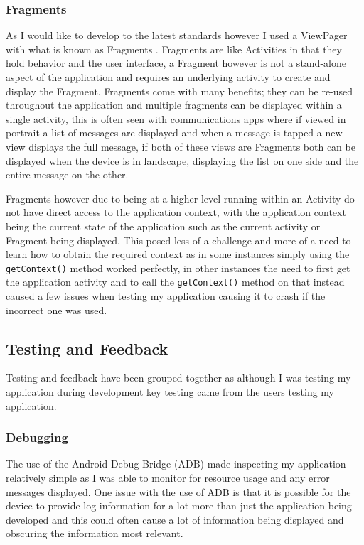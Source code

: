 \subsubsection{Fragments}\label{fragments}

As I would like to develop to the latest standards however I used a
ViewPager with what is known as Fragments \parencite{fragment}.
Fragments are like Activities in that they hold behavior and the user
interface, a Fragment however is not a stand-alone aspect of the
application and requires an underlying activity to create and display
the Fragment. Fragments come with many benefits; they can be re-used
throughout the application and multiple fragments can be displayed
within a single activity, this is often seen with communications apps
where if viewed in portrait a list of messages are displayed and when a
message is tapped a new view displays the full message, if both of these
views are Fragments both can be displayed when the device is in
landscape, displaying the list on one side and the entire message on the
other.

Fragments however due to being at a higher level running within an
Activity do not have direct access to the application context, with the
application context being the current state of the application such as
the current activity or Fragment being displayed. This posed less of a
challenge and more of a need to learn how to obtain the required context
as in some instances simply using the \lstinline!getContext()! method
worked perfectly, in other instances the need to first get the
application activity and to call the \lstinline!getContext()! method on
that instead caused a few issues when testing my application causing it
to crash if the incorrect one was used.

\subsection{Testing and Feedback}\label{testing-and-feedback}

Testing and feedback have been grouped together as although I was
testing my application during development key testing came from the
users testing my application.

\subsubsection{Debugging}\label{debugging}

The use of the Android Debug Bridge (ADB) \parencite{adb} made
inspecting my application relatively simple as I was able to monitor for
resource usage and any error messages displayed. One issue with the use
of ADB is that it is possible for the device to provide log information
for a lot more than just the application being developed and this could
often cause a lot of information being displayed and obscuring the
information most relevant.


